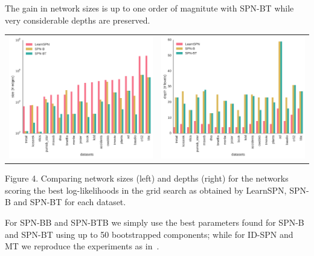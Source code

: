 \documentclass[final]{beamer}
\begin{document}
\begin{frame}{}
\begin{textblock}{25.2}
    The gain in network sizes is up to one order of magnitute with
    \textsf{SPN-BT} while very considerable depths are preserved.
    
    \begin{table}[ht]
      \setlength{\tabcolsep}{30pt}  
      \centering
      \begin{tabular}{c c}
        \includegraphics[width=0.4\linewidth]{figures/edges-comp.pdf}&\includegraphics[width=0.4\linewidth]{figures/levels-comp.pdf}
      \end{tabular}
    \end{table}
    \vspace{-20pt}
    \begin{center}
      \begin{minipage}[t]{0.9\linewidth}
        \tiny\flushleft
        Figure 4. Comparing network sizes (left) and depths (right)
        for the networks scoring the best log-likelihoods in the grid
        search as obtained by \textsf{LearnSPN}, \textsf{SPN-B} and
        \textsf{SPN-BT} for each dataset.
      \end{minipage}
    \end{center}\par\bigskip

    \vspace{15pt}
    For \textsf{SPN-BB} and \textsf{SPN-BTB} we simply use the best
    parameters found for \textsf{SPN-B} and \textsf{SPN-BT} using up
    to 50 bootstrapped components; while for
    \textsf{ID-SPN} and \textsf{MT} we reproduce the experiments as
    in~\parencite{Rooshenas2014-short}.\par\bigskip


\end{textblock}
\end{frame}
\end{document}
